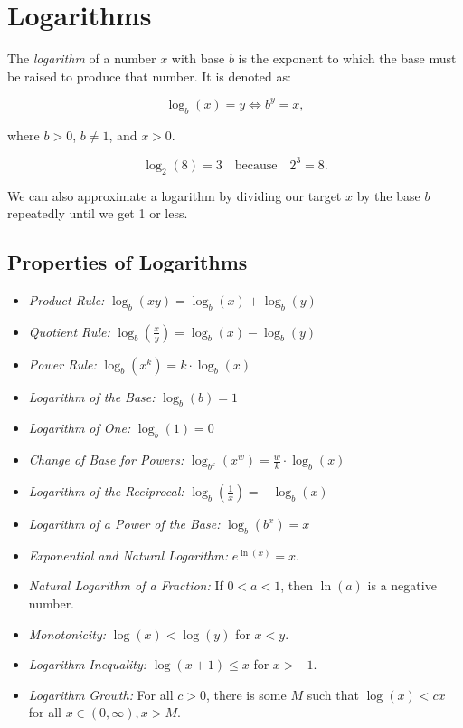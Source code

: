 \chapter{Logarithms}

The \emph{logarithm} of a number \(x\) with base \(b\) is the exponent to which the base must be 
raised to produce that number. It is denoted as:

\[
    \log_b(x) = y \iff b^y = x,
\]

where \(b > 0\), \(b \neq 1\), and \(x > 0\).

\[
    \log_2(8) = 3 \quad \text{because} \quad 2^3 = 8.
\]

We can also approximate a logarithm by dividing our target \(x\) by the base \(b\) repeatedly until 
we get 1 or less.

\section{Properties of Logarithms}

\begin{itemize}

    \item \emph{Product Rule:} \(\log_b(xy) = \log_b(x) + \log_b(y)\)

    \item \emph{Quotient Rule:} \(\log_b\left(\frac{x}{y}\right) = \log_b(x) - \log_b(y)\)

    \item \emph{Power Rule:} \(\log_b(x^k) = k \cdot \log_b(x)\)

    \item \emph{Logarithm of the Base:} \(\log_b(b) = 1\)

    \item \emph{Logarithm of One:} \(\log_b(1) = 0\)

    \item \emph{Change of Base for Powers:} \(\log_{b^k}(x^w) = \frac{w}{k} \cdot \log_b(x)\)

    \item \emph{Logarithm of the Reciprocal:} \(\log_b\left(\frac{1}{x}\right) = -\log_b(x)\)

    \item \emph{Logarithm of a Power of the Base:} \(\log_b(b^x) = x\)

    \item \emph{Exponential and Natural Logarithm:} \(e^{\ln(x)} = x\).

    \item \emph{Natural Logarithm of a Fraction:} If \(0 < a < 1\), then \(\ln(a)\) is a negative number. 

    \item \emph{Monotonicity:} \(\log(x) < \log(y)\) for \(x < y\).

    \item \emph{Logarithm Inequality:} \(\log(x + 1) \le x\) for \(x > -1\).

    \item \emph{Logarithm Growth:} For all \(c > 0\), there is some \(M\) such that \(\log(x) < cx\) for all \(x \in (0, \infty), x > M\).

\end{itemize}

